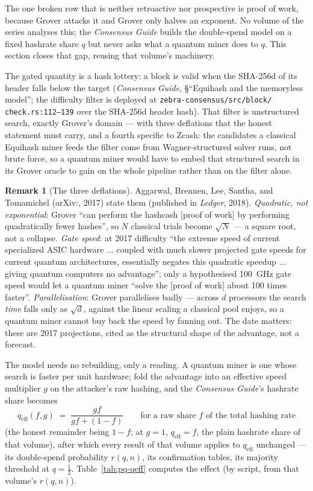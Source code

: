 \documentclass[11pt,a4paper]{article}
\theoremstyle{definition}
\newtheorem{remark}[theorem]{Remark}
\begin{document}
The one broken row that is neither retroactive nor prospective is proof
of work, because Grover attacks it and Grover only halves an exponent.
No volume of the series analyses this; the \emph{Consensus Guide} builds
the double-spend model on a fixed hashrate share $q$ but never asks what
a quantum miner does to $q$. This section closes that gap, reusing that
volume's machinery.

The gated quantity is a hash lottery: a block is valid when the
SHA-256d of its header falls below the target (\emph{Consensus Guide},
\S``Equihash and the memoryless model''; the difficulty filter is
deployed at \texttt{zebra-consensus/src/block/\allowbreak
check.rs:112--139} over the SHA-256d header hash). That filter is
unstructured search, exactly Grover's domain --- with three deflations
that the honest statement must carry, and a fourth specific to Zcash:
the candidates a classical Equihash miner feeds the filter come from
Wagner-structured solver runs, not brute force, so a quantum miner
would have to embed that structured search in its Grover oracle to gain
on the whole pipeline rather than on the filter alone.

\begin{remark}[The three deflations]\label{rem:pq-grover-caveats}
Aggarwal, Brennen, Lee, Santha, and Tomamichel (arXiv:, 2017)
state them (published in \emph{Ledger}, 2018). \emph{Quadratic, not
exponential}: Grover ``can perform the hashcash [proof of work] by
performing quadratically fewer hashes'', so $N$ classical trials become
$\sqrt{N}$ --- a square root, not a collapse. \emph{Gate speed}: at 2017
difficulty ``the extreme speed of
current specialized ASIC hardware $\ldots$ coupled with much slower
projected gate speeds for current quantum architectures, essentially
negates this quadratic speedup $\ldots$ giving quantum computers no
advantage''; only a hypothesised 100~GHz gate speed would let a quantum
miner ``solve the [proof of work] about 100 times faster''.
\emph{Parallelisation}: Grover parallelises badly --- across $d$
processors the search \emph{time} falls only as $\sqrt{d}$, against the
linear scaling a classical pool enjoys, so a quantum miner cannot buy
back the speed by fanning out. The date matters: these are 2017
projections, cited as the structural shape of the advantage, not a
forecast.
\end{remark}

The model needs no rebuilding, only a reading. A quantum miner is one
whose search is faster per unit hardware; fold the advantage into an
effective speed multiplier $g$ on the attacker's raw hashing, and the
\emph{Consensus Guide}'s hashrate share becomes
\[
  q_{\mathrm{eff}}(f, g) \;=\; \frac{g f}{g f + (1 - f)}
  \qquad \text{for a raw share } f \text{ of the total hashing rate}
\]
(the honest remainder being $1 - f$; at $g = 1$, $q_{\mathrm{eff}} = f$,
the plain hashrate share of that volume),
after which every result of that volume applies to $q_{\mathrm{eff}}$
unchanged --- its double-spend probability $r(q, n)$, its confirmation
tables, its majority threshold at $q = \tfrac12$. Table~\ref{tab:pq-qeff}
computes the effect (by script, from that volume's $r(q, n)$).
\end{document}
